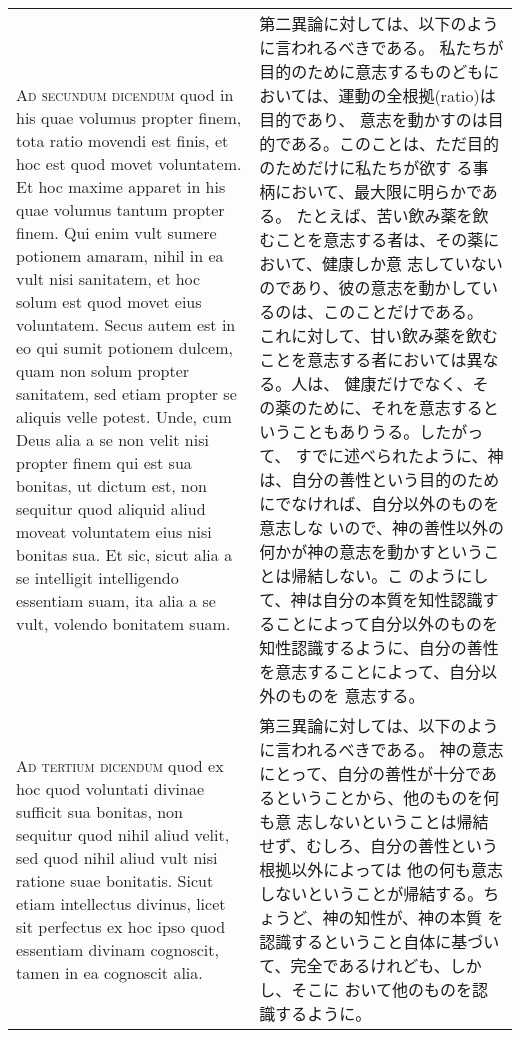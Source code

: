 \documentclass[10pt]{jsarticle} %
\begin{document}
\begin{longtable}{p{21em}p{21em}}
{\scshape Ad secundum dicendum} quod in his quae volumus propter finem,
 tota ratio movendi est finis, et hoc est quod movet voluntatem. Et hoc
 maxime apparet in his quae volumus tantum propter finem. Qui enim vult
 sumere potionem amaram, nihil in ea vult nisi sanitatem, et hoc solum
 est quod movet eius voluntatem. Secus autem est in eo qui sumit
 potionem dulcem, quam non solum propter sanitatem, sed etiam propter se
 aliquis velle potest. Unde, cum Deus alia a se non velit nisi propter
 finem qui est sua bonitas, ut dictum est, non sequitur quod aliquid
 aliud moveat voluntatem eius nisi bonitas sua. Et sic, sicut alia a se
 intelligit intelligendo essentiam suam, ita alia a se vult, volendo
 bonitatem suam.


&

第二異論に対しては、以下のように言われるべきである。
私たちが目的のために意志するものどもにおいては、運動の全根拠(ratio)は目的であり、
意志を動かすのは目的である。このことは、ただ目的のためだけに私たちが欲す
 る事柄において、最大限に明らかである。
たとえば、苦い飲み薬を飲むことを意志する者は、その薬において、健康しか意
 志していないのであり、彼の意志を動かしているのは、このことだけである。
これに対して、甘い飲み薬を飲むことを意志する者においては異なる。人は、
 健康だけでなく、その薬のために、それを意志するということもありうる。したがって、
すでに述べられたように、神は、自分の善性という目的のためにでなければ、自分以外のものを意志しな
 いので、神の善性以外の何かが神の意志を動かすということは帰結しない。こ
 のようにして、神は自分の本質を知性認識することによって自分以外のものを
 知性認識するように、自分の善性を意志することによって、自分以外のものを
 意志する。


\\





{\scshape Ad tertium dicendum} quod ex hoc quod voluntati divinae
 sufficit sua bonitas, non sequitur quod nihil aliud velit, sed quod
 nihil aliud vult nisi ratione suae bonitatis. Sicut etiam intellectus
 divinus, licet sit perfectus ex hoc ipso quod essentiam divinam
 cognoscit, tamen in ea cognoscit alia.


&

第三異論に対しては、以下のように言われるべきである。
神の意志にとって、自分の善性が十分であるということから、他のものを何も意
 志しないということは帰結せず、むしろ、自分の善性という根拠以外によっては
 他の何も意志しないということが帰結する。ちょうど、神の知性が、神の本質
 を認識するということ自体に基づいて、完全であるけれども、しかし、そこに
 おいて他のものを認識するように。



\end{longtable}
\end{document}
